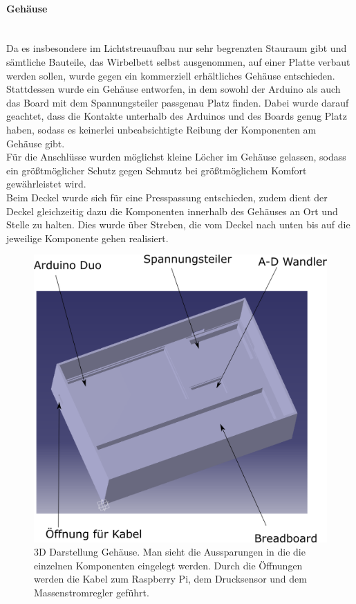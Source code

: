 \paragraph{Gehäuse} 
\hfill \\
Da es insbesondere im Lichtstreuaufbau nur sehr begrenzten Stauraum gibt und sämtliche Bauteile, das Wirbelbett selbst ausgenommen, auf einer Platte verbaut werden sollen, wurde gegen ein kommerziell erhältliches Gehäuse entschieden. \\ 
Stattdessen wurde ein Gehäuse entworfen, in dem sowohl der Arduino als auch das Board mit dem Spannungsteiler passgenau Platz finden. Dabei wurde darauf geachtet, dass die Kontakte unterhalb des Arduinos und des Boards genug Platz haben, sodass es keinerlei unbeabsichtigte Reibung der Komponenten am Gehäuse gibt. \\
Für die Anschlüsse wurden möglichst kleine Löcher im Gehäuse gelassen, sodass ein größtmöglicher Schutz gegen Schmutz bei größtmöglichem Komfort gewährleistet wird. \\
Beim Deckel wurde sich für eine Presspassung entschieden, zudem dient der Deckel gleichzeitig dazu die Komponenten innerhalb des Gehäuses an Ort und Stelle zu halten. Dies wurde über Streben, die vom Deckel nach unten bis auf die jeweilige Komponente gehen realisiert.

\clearpage


\begin{figure}[h!]
	\begin{center}
		\includegraphics[scale=0.45]{Elektronik_Gehaeuse2.png}
		\caption[Gehäuse räumlich]{3D Darstellung Gehäuse. Man sieht die Aussparungen in die die einzelnen Komponenten eingelegt werden. Durch die Öffnungen werden die Kabel zum Raspberry Pi, dem Drucksensor und dem Massenstromregler geführt.}
	\end{center}
\end{figure}

